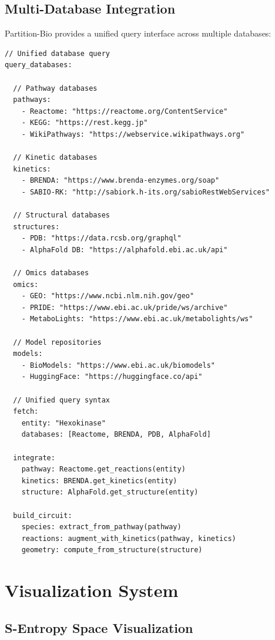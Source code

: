 \documentclass[12pt,a4paper]{article}
\begin{document}
\subsection{Multi-Database Integration}

Partition-Bio provides a unified query interface across multiple databases:

\begin{lstlisting}[basicstyle=\ttfamily\small]
// Unified database query
query_databases:
  
  // Pathway databases
  pathways:
    - Reactome: "https://reactome.org/ContentService"
    - KEGG: "https://rest.kegg.jp"
    - WikiPathways: "https://webservice.wikipathways.org"
  
  // Kinetic databases
  kinetics:
    - BRENDA: "https://www.brenda-enzymes.org/soap"
    - SABIO-RK: "http://sabiork.h-its.org/sabioRestWebServices"
  
  // Structural databases
  structures:
    - PDB: "https://data.rcsb.org/graphql"
    - AlphaFold DB: "https://alphafold.ebi.ac.uk/api"
  
  // Omics databases
  omics:
    - GEO: "https://www.ncbi.nlm.nih.gov/geo"
    - PRIDE: "https://www.ebi.ac.uk/pride/ws/archive"
    - MetaboLights: "https://www.ebi.ac.uk/metabolights/ws"
  
  // Model repositories
  models:
    - BioModels: "https://www.ebi.ac.uk/biomodels"
    - HuggingFace: "https://huggingface.co/api"
  
  // Unified query syntax
  fetch:
    entity: "Hexokinase"
    databases: [Reactome, BRENDA, PDB, AlphaFold]
    
  integrate:
    pathway: Reactome.get_reactions(entity)
    kinetics: BRENDA.get_kinetics(entity)
    structure: AlphaFold.get_structure(entity)
    
  build_circuit:
    species: extract_from_pathway(pathway)
    reactions: augment_with_kinetics(pathway, kinetics)
    geometry: compute_from_structure(structure)
\end{lstlisting}

\section{Visualization System}

\subsection{S-Entropy Space Visualization}
\end{document}
